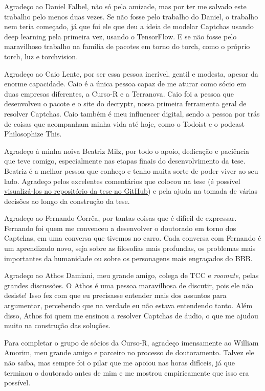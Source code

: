 \documentclass[12pt,twoside,brazilian]{book}
\begin{document}
Agradeço ao Daniel Falbel, não só pela amizade, mas por ter me salvado este trabalho pelo menos duas vezes. Se não fosse pelo trabalho do Daniel, o trabalho nem teria começado, já que foi ele que deu a ideia de modelar Captchas usando deep learning pela primeira vez, usando o TensorFlow. E se não fosse pelo maravilhoso trabalho na família de pacotes em torno do torch, como o próprio torch, luz e torchvision.

Agradeço ao Caio Lente, por ser essa pessoa incrível, gentil e modesta, apesar da enorme capacidade. Caio é a única pessoa capaz de me aturar como sócio em duas empresas diferentes, a Curso-R e a Terranova. Caio foi a pessoa que desenvolveu o pacote e o site do decryptr, nossa primeira ferramenta geral de resolver Captchas. Caio também é meu influencer digital, sendo a pessoa por trás de coisas que acompanham minha vida até hoje, como o Todoist e o podcast Philosophize This.

Agradeço à minha noiva Beatriz Milz, por todo o apoio, dedicação e paciência que teve comigo, especialmente nas etapas finais do desenvolvimento da tese. Beatriz é a melhor pessoa que conheço e tenho muita sorte de poder viver ao seu lado. Agradeço pelos excelentes comentários que colocou na tese (é possível \href{https://github.com/jtrecenti/doutorado/pulls?q=is\%3Apr}{visualizá-los no repositório da tese no GitHub}) e pela ajuda na tomada de várias decisões ao longo da construção da tese.

Agradeço ao Fernando Corrêa, por tantas coisas que é difícil de expressar. Fernando foi quem me convenceu a desenvolver o doutorado em torno dos Captchas, em uma conversa que tivemos no carro. Cada conversa com Fernando é um aprendizado novo, seja sobre as filosofias mais profundas, os problemas mais importantes da humanidade ou sobre os personagens mais engraçados do BBB.

Agradeço ao Athos Damiani, meu grande amigo, colega de TCC e \textit{roomate}, pelas grandes discussões. O Athos é uma pessoa maravilhosa de discutir, pois ele não desiste! Isso fez com que eu precisasse entender mais dos assuntos para argumentar, percebendo que na verdade eu não estava entendendo tanto. Além disso, Athos foi quem me ensinou a resolver Captchas de áudio, o que me ajudou muito na construção das soluções.

Para completar o grupo de sócios da Curso-R, agradeço imensamente ao William Amorim, meu grande amigo e parceiro no processo de doutoramento. Talvez ele não saiba, mas sempre foi o pilar que me apoiou nas horas difíceis, já que terminou o doutorado antes de mim e me mostrou empiricamente que isso era possível.
\end{document}
